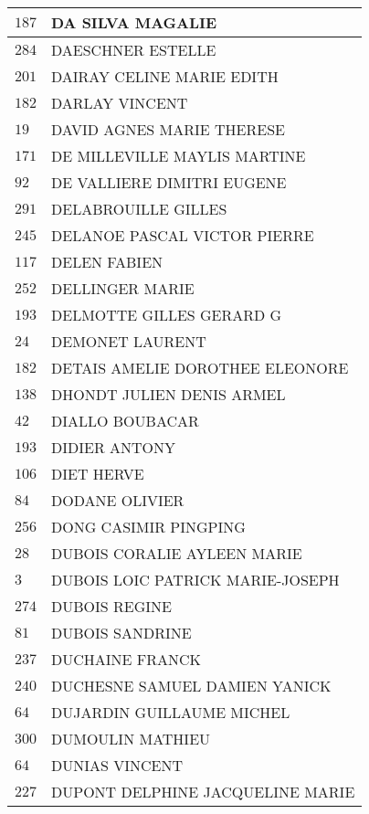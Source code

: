 \begin{xltabular}{\linewidth}{|l|X|}
    \hline
    $187$ & DA SILVA MAGALIE \\
    \hline
    $284$ & DAESCHNER ESTELLE \\
    \hline
    $201$ & DAIRAY CELINE MARIE EDITH \\
    \hline
    $182$ & DARLAY VINCENT \\
    \hline
    $19$ & DAVID AGNES MARIE THERESE \\
    \hline
    $171$ & DE MILLEVILLE MAYLIS MARTINE \\
    \hline
    $92$ & DE VALLIERE DIMITRI EUGENE \\
    \hline
    $291$ & DELABROUILLE GILLES \\
    \hline
    $245$ & DELANOE PASCAL VICTOR PIERRE \\
    \hline
    $117$ & DELEN FABIEN \\
    \hline
    $252$ & DELLINGER MARIE \\
    \hline
    $193$ & DELMOTTE GILLES GERARD G \\
    \hline
    $24$ & DEMONET LAURENT \\
    \hline
    $182$ & DETAIS AMELIE DOROTHEE ELEONORE \\
    \hline
    $138$ & DHONDT JULIEN DENIS ARMEL \\
    \hline
    $42$ & DIALLO BOUBACAR \\
    \hline
    $193$ & DIDIER ANTONY \\
    \hline
    $106$ & DIET HERVE \\
    \hline
    $84$ & DODANE OLIVIER \\
    \hline
    $256$ & DONG CASIMIR PINGPING \\
    \hline
    $28$ & DUBOIS CORALIE AYLEEN MARIE \\
    \hline
    $3$ & DUBOIS LOIC PATRICK MARIE-JOSEPH \\
    \hline
    $274$ & DUBOIS REGINE \\
    \hline
    $81$ & DUBOIS SANDRINE \\
    \hline
    $237$ & DUCHAINE FRANCK \\
    \hline
    $240$ & DUCHESNE SAMUEL DAMIEN YANICK \\
    \hline
    $64$ & DUJARDIN GUILLAUME MICHEL \\
    \hline
    $300$ & DUMOULIN MATHIEU \\
    \hline
    $64$ & DUNIAS VINCENT \\
    \hline
    $227$ & DUPONT DELPHINE JACQUELINE MARIE \\

\end{xltabular}
